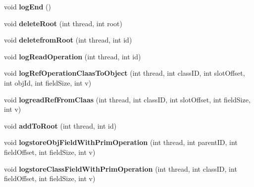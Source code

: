 \begin{DoxyCompactItemize}
\item 
\hypertarget{classtrace_gen_1_1_logger_a63ab0fee325c00f2c37e89eb59ce87e3}{}void {\bfseries log\+End} ()\label{classtrace_gen_1_1_logger_a63ab0fee325c00f2c37e89eb59ce87e3}

\item 
\hypertarget{classtrace_gen_1_1_logger_a458734234d70ee9887ed57395c1c9038}{}void {\bfseries delete\+Root} (int thread, int root)\label{classtrace_gen_1_1_logger_a458734234d70ee9887ed57395c1c9038}

\item 
\hypertarget{classtrace_gen_1_1_logger_afcd141dada3c289c6b55e744fecd02bf}{}void {\bfseries deletefrom\+Root} (int thread, int id)\label{classtrace_gen_1_1_logger_afcd141dada3c289c6b55e744fecd02bf}

\item 
\hypertarget{classtrace_gen_1_1_logger_a19848a7952e577192350ee7ed843c1ad}{}void {\bfseries log\+Read\+Operation} (int thread, int id)\label{classtrace_gen_1_1_logger_a19848a7952e577192350ee7ed843c1ad}

\item 
\hypertarget{classtrace_gen_1_1_logger_a420b495fe288d2ea6ee2a6903e5965c4}{}void {\bfseries log\+Ref\+Operation\+Claas\+To\+Object} (int thread, int class\+I\+D, int slot\+Offset, int obj\+Id, int field\+Size, int v)\label{classtrace_gen_1_1_logger_a420b495fe288d2ea6ee2a6903e5965c4}

\item 
\hypertarget{classtrace_gen_1_1_logger_ad63b1f2e2fefd11021df6ff7114fb925}{}void {\bfseries logread\+Ref\+From\+Claas} (int thread, int class\+I\+D, int slot\+Offset, int field\+Size, int v)\label{classtrace_gen_1_1_logger_ad63b1f2e2fefd11021df6ff7114fb925}

\item 
\hypertarget{classtrace_gen_1_1_logger_a1c48c20c9bc3c77cd4c0973781bb532d}{}void {\bfseries add\+To\+Root} (int thread, int id)\label{classtrace_gen_1_1_logger_a1c48c20c9bc3c77cd4c0973781bb532d}

\item 
\hypertarget{classtrace_gen_1_1_logger_a8f2e2c41be75e4cf1038c443d259c684}{}void {\bfseries logstore\+Obj\+Field\+With\+Prim\+Operation} (int thread, int parent\+I\+D, int field\+Offset, int field\+Size, int v)\label{classtrace_gen_1_1_logger_a8f2e2c41be75e4cf1038c443d259c684}

\item 
\hypertarget{classtrace_gen_1_1_logger_a242309ea2f8a3193d45a68fe14022aba}{}void {\bfseries logstore\+Class\+Field\+With\+Prim\+Operation} (int thread, int class\+I\+D, int field\+Offset, int field\+Size, int v)\label{classtrace_gen_1_1_logger_a242309ea2f8a3193d45a68fe14022aba}


\end{DoxyCompactItemize}
